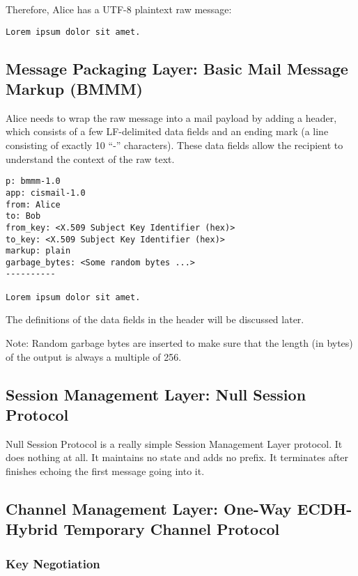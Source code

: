 \documentclass[a4paper,11pt]{article}
\begin{document}
Therefore, Alice has a UTF-8 plaintext raw message:

\begin{lstlisting}
Lorem ipsum dolor sit amet.
\end{lstlisting}

\subsection{Message Packaging Layer: Basic Mail Message Markup (BMMM)}

Alice needs to wrap the raw message into a mail payload by adding a header,
which consists of a few LF-delimited data fields and an ending mark (a line consisting of exactly 10 ``-'' characters).
These data fields allow the recipient to understand the context of the raw text.

\begin{lstlisting}
p: bmmm-1.0
app: cismail-1.0
from: Alice
to: Bob
from_key: <X.509 Subject Key Identifier (hex)>
to_key: <X.509 Subject Key Identifier (hex)>
markup: plain
garbage_bytes: <Some random bytes ...>
----------

Lorem ipsum dolor sit amet.
\end{lstlisting}

The definitions of the data fields in the header will be discussed later.

Note: Random garbage bytes are inserted to make sure that the length (in bytes) of the output is always a multiple of 256.

\subsection{Session Management Layer: Null Session Protocol}

Null Session Protocol is a really simple Session Management Layer protocol.
It does nothing at all.
It maintains no state and adds no prefix.
It terminates after finishes echoing the first message going into it.

\subsection{Channel Management Layer: One-Way ECDH-Hybrid Temporary Channel Protocol}

\subsubsection{Key Negotiation}
\end{document}
